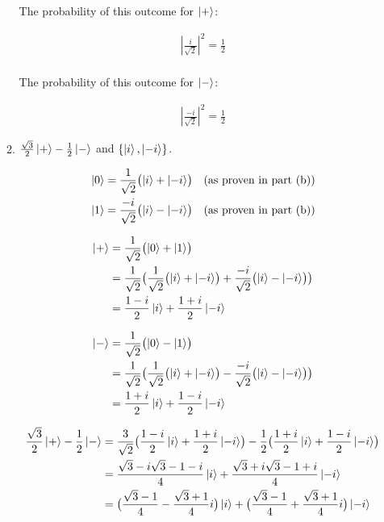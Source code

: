 \documentclass{article}
\begin{document}
\begin{enumerate}
\begin{enumerate}
The probability of this outcome for $\ket{+}$:

\begin{align*}
  |\frac{i}{\sqrt{2}}|^2 = \frac{1}{2} \\
\end{align*}

The probability of this outcome for $\ket{-}$:

\begin{align*}
  |\frac{-i}{\sqrt{2}}|^2 = \frac{1}{2}
\end{align*}

		\item $\frac{\sqrt{3}}{2} \ket{+} - \frac{1}{2} \ket{-}$ and $\{\ket{i}, \ket{-i}\}$.

\begin{align*}
	\ket{0} = \frac{1}{\sqrt{2}} \bigl(\ket{i} + \ket{-i}\bigr) &&\text{(as proven in part (b))} \\
        \ket{1} = \frac{-i}{\sqrt{2}} \bigl(\ket{i} - \ket{-i}\bigr)&&\text{(as proven in part (b))} \\
\end{align*}

\begin{align*}
	\ket{+} &= \frac{1}{\sqrt{2}} \bigl(\ket{0} + \ket{1}\bigr) \\
	&= \frac{1}{\sqrt{2}} \bigl( \frac{1}{\sqrt{2}} \bigl( \ket{i} + \ket{-i} \bigr) + \frac{-i}{\sqrt{2}} \bigl( \ket{i} - \ket{-i} \bigr) \bigr) \\
	&= \frac{1 - i}{2}\ket{i} + \frac{1 + i}{2}\ket{-i}
\end{align*}

\begin{align*}
	\ket{-} &= \frac{1}{\sqrt{2}} \bigl(\ket{0} - \ket{1}\bigr) \\
	&= \frac{1}{\sqrt{2}} \bigl( \frac{1}{\sqrt{2}} \bigl( \ket{i} + \ket{-i} \bigr) - \frac{-i}{\sqrt{2}} \bigl( \ket{i} - \ket{-i} \bigr) \bigr) \\
	&= \frac{1 + i}{2}\ket{i} + \frac{1 - i}{2}\ket{-i}
\end{align*}

\begin{align*}
	\frac{\sqrt{3}}{2} \ket{+} - \frac{1}{2} \ket{-} &= \frac{3}{\sqrt{2}} \bigl( \frac{1 - i}{2}\ket{i} + \frac{1 + i}{2} \ket{-i} \bigr) - \frac{1}{2} \bigl( \frac{1 + i}{2} \ket{i} + \frac{1 - i}{2} \ket{-i} \bigr) \\
	&= \frac{\sqrt{3} - i\sqrt{3} - 1 - i}{4}\ket{i} + \frac{\sqrt{3} + i\sqrt{3} - 1 + i}{4} \ket{-i} \\
	&= \bigl( \frac{\sqrt{3} - 1}{4} - \frac{\sqrt{3} + 1}{4}i \bigr) \ket{i} + \bigl(\frac{\sqrt{3} - 1}{4} + \frac{\sqrt{3} + 1}{4}i \bigr) \ket{-i}
\end{align*}


\end{enumerate}
\end{enumerate}
\end{document}

